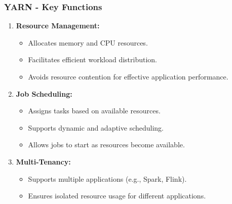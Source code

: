 \documentclass[aspectratio=169]{beamer}
\begin{document}
\begin{frame}[fragile]
    \frametitle{YARN - Key Functions}
    \begin{enumerate}
        \item \textbf{Resource Management:}
            \begin{itemize}
                \item Allocates memory and CPU resources.
                \item Facilitates efficient workload distribution.
                \item Avoids resource contention for effective application performance.
            \end{itemize}
        
        \item \textbf{Job Scheduling:}
            \begin{itemize}
                \item Assigns tasks based on available resources.
                \item Supports dynamic and adaptive scheduling.
                \item Allows jobs to start as resources become available.
            \end{itemize}
        
        \item \textbf{Multi-Tenancy:}
            \begin{itemize}
                \item Supports multiple applications (e.g., Spark, Flink).
                \item Ensures isolated resource usage for different applications.
            \end{itemize}
    \end{enumerate}
\end{frame}
\end{document}
